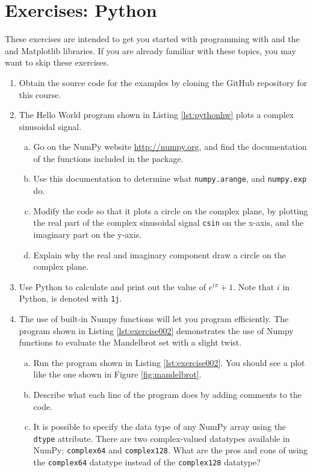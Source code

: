 \newpage
\section{Exercises: Python}

These exercises are intended to get you started with programming with
\emph{} and the \emph{} and
Matplotlib libraries. If you are already familiar with these topics,
you may want to skip these exercises.

\begin{enumerate}
 \item Obtain the source code for the examples by cloning the GitHub
   repository for this course. 
\item The Hello World program shown in Listing \ref{lst:pythonhw} plots a complex sinusoidal signal. 
  \begin{enumerate}[a)]
  \item Go on the NumPy website \url{http://numpy.org}, and find the documentation of the functions included in the package.
  \item Use this documentation to determine what \verb|numpy.arange|, and \verb|numpy.exp| do. 
  \item Modify the code so that it plots a circle on the complex
    plane, by plotting the real part of the complex sinusoidal
    signal \verb|csin| on the x-axis, and the imaginary part on the
    y-axis.
  \item Explain why the real and imaginary component draw a circle on the complex plane.
  \end{enumerate}

\item Use Python to calculate and print out the value of $e^{i \pi} + 1$. Note that $i$ in Python, is denoted
  with \verb|1j|.
  
\item The use of built-in Numpy functions will let you program
  efficiently. The program shown in Listing \ref{lst:exercise002}
  demonstrates the use of Numpy functions to evaluate the Mandelbrot
  set with a slight twist.



\begin{enumerate}[a)]
  \item Run the program shown in Listing \ref{lst:exercise002}. You
    	should see a plot like the one shown in Figure \ref{fig:mandelbrot}.
  \item Describe what each line of the program does by adding comments to the code.
  \item It is possible to specify the data type of any NumPy array
      	using the \verb|dtype| attribute. There are two complex-valued
      	datatypes available in NumPy: \verb|complex64| and \verb|complex128|. 
      	What are the pros and cons of using the \verb|complex64| datatype 
      	instead of the \verb|complex128| datatype? 
\end{enumerate}



\end{enumerate}
